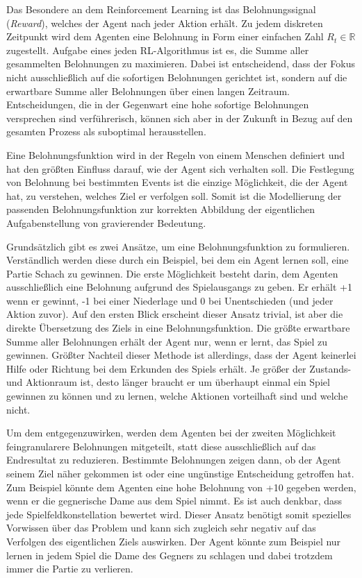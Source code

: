 Das Besondere an dem Reinforcement Learning ist das Belohnungssignal (\textit{Reward}), welches der Agent nach jeder Aktion erhält. Zu jedem diskreten Zeitpunkt wird dem Agenten eine Belohnung in Form einer einfachen Zahl $R_t \in \mathbb{R}$ zugestellt. Aufgabe eines jeden RL-Algorithmus ist es, die Summe aller gesammelten Belohnungen zu maximieren. Dabei ist entscheidend, dass der Fokus nicht ausschließlich auf die sofortigen Belohnungen gerichtet ist, sondern auf die erwartbare Summe aller Belohnungen über einen langen Zeitraum. Entscheidungen, die in der Gegenwart eine hohe sofortige Belohnungen versprechen sind verführerisch, können sich aber in der Zukunft in Bezug auf den gesamten Prozess als suboptimal herausstellen. \cite[~S.53]{Sutton1998}
\par 
Eine Belohnungsfunktion wird in der Regeln von einem Menschen definiert und hat den größten Einfluss darauf, wie der Agent sich verhalten soll. Die Festlegung von Belohnung bei bestimmten Events ist die einzige Möglichkeit, die der Agent hat, zu verstehen, welches Ziel er verfolgen soll. Somit ist die Modellierung der passenden Belohnungsfunktion zur korrekten Abbildung der eigentlichen Aufgabenstellung von gravierender Bedeutung.
\par 
Grundsätzlich gibt es zwei Ansätze, um eine Belohnungsfunktion zu formulieren. Verständlich werden diese durch ein Beispiel, bei dem ein Agent lernen soll, eine Partie Schach zu gewinnen. Die erste Möglichkeit besteht darin, dem Agenten ausschließlich eine Belohnung aufgrund des Spielausgangs zu geben. Er erhält +1 wenn er gewinnt, -1 bei einer Niederlage und 0 bei Unentschieden (und jeder Aktion zuvor). Auf den ersten Blick erscheint dieser Ansatz trivial, ist aber die direkte Übersetzung des Ziels in eine Belohnungsfunktion. Die größte erwartbare Summe aller Belohnungen erhält der Agent nur, wenn er lernt, das Spiel zu gewinnen. Größter Nachteil dieser Methode ist allerdings, dass der Agent keinerlei Hilfe oder Richtung bei dem Erkunden des Spiels erhält. Je größer der Zustands- und Aktionraum ist, desto länger braucht er um überhaupt einmal ein Spiel gewinnen zu können und zu lernen, welche Aktionen vorteilhaft sind und welche nicht.
\par 
Um dem entgegenzuwirken, werden dem Agenten bei der zweiten Möglichkeit feingranularere Belohnungen mitgeteilt, statt diese ausschließlich auf das Endresultat zu reduzieren. Bestimmte Belohnungen zeigen dann, ob der Agent seinem Ziel näher gekommen ist oder eine ungünstige Entscheidung getroffen hat. Zum Beispiel könnte dem Agenten eine hohe Belohnung von +10 gegeben werden, wenn er die gegnerische Dame aus dem Spiel nimmt. Es ist auch denkbar, dass jede Spielfeldkonstellation bewertet wird. Dieser Ansatz benötigt somit spezielles Vorwissen über das Problem und kann sich zugleich sehr negativ auf das Verfolgen des eigentlichen Ziels auswirken. Der Agent könnte zum Beispiel nur lernen in jedem Spiel die Dame des Gegners zu schlagen und dabei trotzdem immer die Partie zu verlieren.
